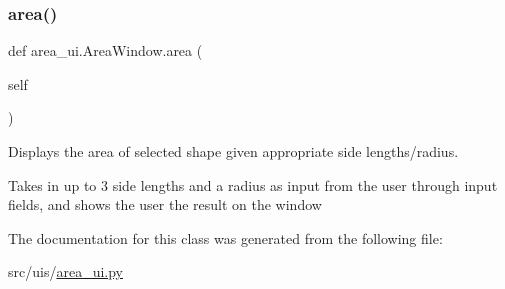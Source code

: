 \subsubsection{\texorpdfstring{area()}{area()}}
{\footnotesize\ttfamily def area\+\_\+ui.\+Area\+Window.\+area (\begin{DoxyParamCaption}\item[{}]{self }\end{DoxyParamCaption})}



Displays the area of selected shape given appropriate side lengths/radius. 

Takes in up to 3 side lengths and a radius as input from the user through input fields, and shows the user the result on the window 

The documentation for this class was generated from the following file\+:\begin{DoxyCompactItemize}
\item 
src/uis/\hyperlink{area__ui_8py}{area\+\_\+ui.\+py}\end{DoxyCompactItemize}

